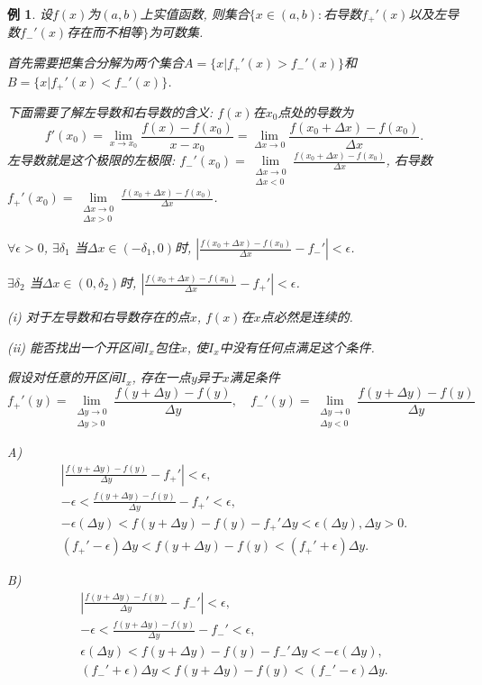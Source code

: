 \documentclass[12pt,a4paper,openany]{book}
\newtheorem{example}{例}
\begin{document}
\begin{example}
设$f(x)$为$(a, b)$上实值函数, 则集合$\{x \in (a, b):$右导数$f_+'(x)$以及左导数$f_-'(x)$存在而不相等$\}$为可数集.

首先需要把集合分解为两个集合$A = \{ x| f_+'(x) > f_-'(x)\}$和$B = \{x|f_+'(x) < f_-'(x)\}$.

下面需要了解左导数和右导数的含义: $f(x)$在$x_0$点处的导数为
$$
f'(x_0) = \lim_{x \rightarrow x_0}\frac{f(x) - f(x_0)}{x - x_0} = \lim_{\Delta{x} \rightarrow 0}\frac{f(x_0 + \Delta{x}) - f(x_0)}{\Delta{x}}.
$$
左导数就是这个极限的左极限: $f_-'(x_0) = \lim\limits_{\substack{\Delta{x} \rightarrow 0 \\ \Delta{x} < 0}}\frac{f(x_0 + \Delta{x}) - f(x_0)}{\Delta{x}}$, 右导数$f_+'(x_0) = \lim\limits_{\substack{\Delta{x} \rightarrow 0 \\ \Delta{x} > 0}}\frac{f(x_0 + \Delta{x}) - f(x_0)}{\Delta{x}}$.

$\forall \epsilon > 0$, $\exists \delta_1$ 当$\Delta{x} \in (-\delta_1, 0)$时, $|\frac{f(x_0 + \Delta{x}) - f(x_0)}{\Delta{x}} - f_-'| < \epsilon$.

$\exists \delta_2$ 当$\Delta{x} \in (0, \delta_2)$时, $|\frac{f(x_0 + \Delta{x}) - f(x_0)}{\Delta{x}} - f_+'| < \epsilon$.

(i) 对于左导数和右导数存在的点$x$, $f(x)$在$x$点必然是连续的.

(ii) 能否找出一个开区间$I_x$包住$x$, 使$I_x$中没有任何点满足这个条件.

假设对任意的开区间$I_x$, 存在一点$y$异于$x$满足条件
$$
f_+'(y) = \lim_{\substack{\Delta{y} \rightarrow 0 \\ \Delta{y} > 0}}{\frac{f(y + \Delta{y}) - f(y)}{\Delta{y}}}, \quad f_-'(y) = \lim_{\substack{\Delta{y} \rightarrow 0 \\ \Delta{y} < 0}}{\frac{f(y + \Delta{y}) - f(y)}{\Delta{y}}}
$$

A) 
\begin{gather*}
|\frac{f(y + \Delta{y}) - f(y)}{\Delta{y}} - f_+'| < \epsilon, \\
-\epsilon < \frac{f(y + \Delta{y}) - f(y)}{\Delta{y}} - f_+' < \epsilon, \\
-\epsilon(\Delta{y}) < f(y + \Delta{y}) - f(y) - f_+'\Delta{y} < \epsilon(\Delta{y}), \Delta{y} > 0. \\
(f_+'-\epsilon)\Delta{y} < f(y + \Delta{y}) - f(y)< (f_+' + \epsilon)\Delta{y}.
\end{gather*}

B)
\begin{gather*}
|\frac{f(y + \Delta{y}) - f(y)}{\Delta{y}} - f_-'| < \epsilon,\\
-\epsilon < \frac{f(y + \Delta{y}) - f(y)}{\Delta{y}} - f_-' < \epsilon,\\
\epsilon(\Delta{y}) < f(y + \Delta{y}) - f(y) - f_-'\Delta{y} < -\epsilon(\Delta{y}),\\
(f_-'+\epsilon)\Delta{y} < f(y + \Delta{y}) - f(y)< (f_-' - \epsilon)\Delta{y}.
\end{gather*}


\end{example}
\end{document}

